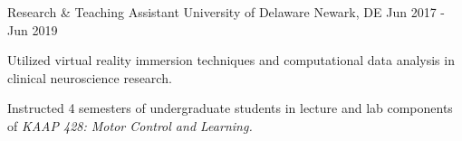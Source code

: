 \begin{cventries}
  \cventry
    {Research \& Teaching Assistant} %
    {University of Delaware} %
    {Newark, DE} %
    {Jun 2017 - Jun 2019} %
    {
      \begin{cvitems} %
        \item {Utilized virtual reality immersion techniques and computational data analysis in clinical neuroscience research.}
        \item {Instructed 4 semesters of undergraduate students in lecture and lab components of \textit{KAAP 428: Motor Control and Learning.}}
      \end{cvitems}
    }

\end{cventries}
